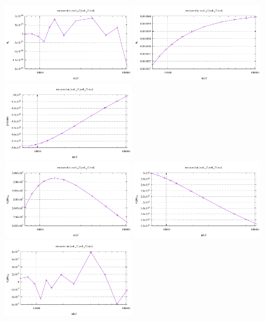 \begin{center}
\includegraphics[width=5.6cm]{python_codes/fieldstone_124/results/exp1/south_ux}
\includegraphics[width=5.6cm]{python_codes/fieldstone_124/results/exp1/south_uy}
\includegraphics[width=5.6cm]{python_codes/fieldstone_124/results/exp1/south_p}\\
\includegraphics[width=5.6cm]{python_codes/fieldstone_124/results/exp1/south_sigmaxx}
\includegraphics[width=5.6cm]{python_codes/fieldstone_124/results/exp1/south_sigmayy}
\includegraphics[width=5.6cm]{python_codes/fieldstone_124/results/exp1/south_sigmaxy}
\end{center}







